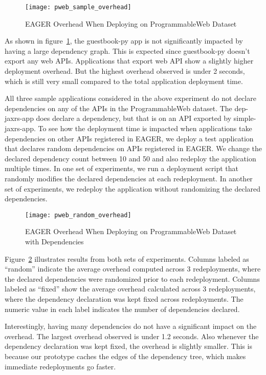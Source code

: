 \begin{figure}
\centering
\texttt{[image: pweb\_sample\_overhead]}
\caption{EAGER Overhead When Deploying on ProgrammableWeb Dataset}
\label{fig:pweb_sample_overhead}
\end{figure}

As shown in figure~\ref{fig:pweb_sample_overhead}, the guestbook-py app is not significantly impacted by having a large dependency graph. This is
expected since guestbook-py doesn't export any web APIs. Applications that export web API show a slightly higher deployment overhead. 
But the highest overhead observed is under 2 seconds, which is still very small compared
to the total application deployment time. 

All three sample applications considered in the above experiment do not declare dependencies on any of the APIs in the ProgrammableWeb
dataset. The dep-jaxrs-app does declare a dependency, but that is on an API exported by simple-jaxrs-app. To see how the deployment time is impacted
when applications take dependencies on other APIs registered in EAGER, we deploy a test application that declares random dependencies on APIs
registered in EAGER. We change the declared dependency count between 10 and 50 and also redeploy the application multiple times.
In one set of experiments, we run a deployment script that randomly modifies the declared dependencies at each redeployment. In another set of 
experiments, we redeploy the application without randomizing the declared dependencies.

\begin{figure}
\centering
\texttt{[image: pweb\_random\_overhead]}
\caption{EAGER Overhead When Deploying on ProgrammableWeb Dataset with Dependencies}
\label{fig:pweb_random_overhead}
\end{figure}

Figure~\ref{fig:pweb_random_overhead} illustrates results from both sets of experiments. Columns labeled as ``random'' indicate the average overhead
computed across 3 redeployments, where the declared dependencies were randomized prior to each redeployment. Columns labeled as ``fixed'' show
the average overhead calculated across 3 redeployments, where the dependency declaration was kept fixed across redeployments. The numeric value
in each label indicates the number of dependencies declared.

Interestingly, having many dependencies do not have a significant impact on the overhead. %
The largest overhead observed is under 1.2 seconds.
Also whenever the dependency declaration was kept fixed, the overhead is slightly smaller. This is because our prototype caches
the edges of the dependency tree, which makes immediate redeployments go faster.

